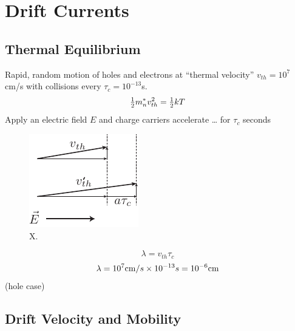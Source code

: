 \section{Drift Currents}











\subsection{Thermal Equilibrium}


 Rapid, random motion of holes and electrons at “thermal velocity” $v_{th} = 10^7$ cm/s with collisions every $\tau_c = 10^{-13}$s.
\begin{equation}
	{\textstyle{1 \over 2}}m_n^*v_{th}^2 = {\textstyle{1 \over 2}}kT
\end{equation}
 Apply an electric field $E$ and charge carriers accelerate … for $\tau_c$ seconds






\begin{figure}
\begin{center}
\includegraphics[width=.5\columnwidth]{drift_field}
\end{center}
\caption{X. } \label{fig:drift_field}
\end{figure}
\begin{equation} \lambda  = {v_{th}}{\tau _c}\end{equation}
\begin{equation} 
	\lambda  = {10^7}{\rm{cm}}/s \times {10^{ - 13}}s = {10^{ - 6}}{\rm{cm}}
\end{equation}
(hole case)





\subsection{Drift Velocity and Mobility}

